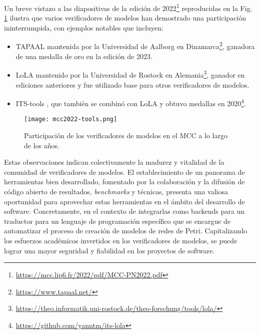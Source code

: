 Un breve vistazo a las diapositivas de la edición de 2022\footnote{\url{https://mcc.lip6.fr/2022/pdf/MCC-PN2022.pdf}}
reproducidas en la Fig. \ref{fig:mcc2022-tools} ilustra que varios verificadores de modelos han demostrado una participación ininterrumpida, con ejemplos
notables que incluyen:

\begin{itemize}
      \item \acrfull{TAPAAL} mantenida
            por la Universidad de Aalborg en Dinamarca\footnote{\url{https://www.tapaal.net/}},
            ganadora de una medalla de oro en la edición de 2023.
      \item \acrfull{LoLA} mantenido por la Universidad de
            Rostock en Alemania\footnote{\url{https://theo.informatik.uni-rostock.de/theo-forschung/tools/lola/}},
            ganador en ediciones anteriores y fue utilizado base para otros verificadores de modelos.
      \item ITS-tools \cite{thierrymieg:hal-02104373},
            que también se combinó con \acrshort{LoLA} y obtuvo medallas en
            2020\footnote{\url{https://github.com/yanntm/its-lola}}.
\end{itemize}

\begin{figure}[!htb]
      \centering
      \texttt{[image: mcc2022-tools.png]}
      \caption{Participación de los verificadores de modelos en el MCC a lo largo de los años.}
      \label{fig:mcc2022-tools}
\end{figure}

Estas observaciones indican colectivamente la madurez y vitalidad de la comunidad de
verificadores de modelos. El establecimiento de un panorama de herramientas bien
desarrollado, fomentado por la colaboración y la difusión de código abierto de resultados, \textit{benchmarks} y técnicas,
presenta una valiosa oportunidad para aprovechar estas herramientas en el ámbito del
desarrollo de software. Concretamente, en el contexto de integrarlas como backends para un
traductor para un lenguaje de programación específico que se encargue de automatizar el proceso de creación de
modelos de redes de Petri. Capitalizando los esfuerzos académicos invertidos en los
verificadores de modelos, se puede lograr una mayor seguridad y fiabilidad en los proyectos
de software.
